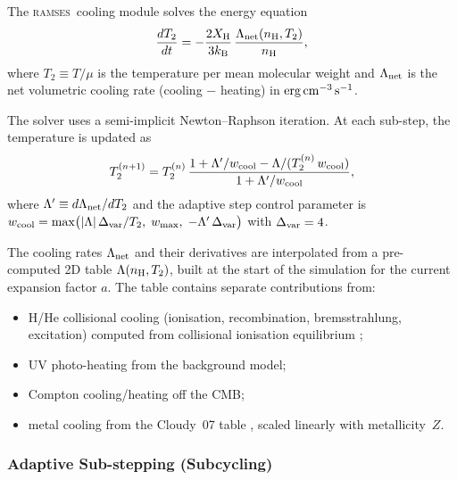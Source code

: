 \documentclass[fleqn,usenatbib]{mnras}
\newcommand{\ramses}{\textsc{ramses}}
\begin{document}
The \ramses\ cooling module solves the energy equation
\begin{equation}
  \frac{dT_2}{dt} = -\frac{2 X_{\rm H}}{3 k_{\rm B}}\,
  \frac{\Lambda_{\rm net}(n_{\rm H}, T_2)}{n_{\rm H}},
  \label{eq:cooling_ode}
\end{equation}
where $T_2 \equiv T/\mu$ is the temperature per mean molecular weight
and $\Lambda_{\rm net}$ is the net volumetric cooling rate
(cooling $-$ heating) in $\rm erg\,cm^{-3}\,s^{-1}$.

The solver uses a semi-implicit Newton--Raphson iteration.  At each
sub-step, the temperature is updated as
\begin{equation}
  T_2^{(n+1)} = T_2^{(n)}\,
  \frac{1 + \Lambda'/w_{\rm cool} - \Lambda/(T_2^{(n)}\,w_{\rm cool})}
       {1 + \Lambda'/w_{\rm cool}},
  \label{eq:NR_update}
\end{equation}
where $\Lambda' \equiv d\Lambda_{\rm net}/dT_2$ and the adaptive step
control parameter is
$w_{\rm cool} = \max\bigl(|\Lambda|\,\Delta_{\rm var}/T_2,\;
w_{\rm max},\;{-\Lambda'\,\Delta_{\rm var}}\bigr)$
with $\Delta_{\rm var} = 4$.

The cooling rates $\Lambda_{\rm net}$ and their derivatives are
interpolated from a pre-computed 2D table
$\Lambda(n_{\rm H}, T_2)$, built at the start of the simulation for the
current expansion factor $a$.  The table contains separate contributions
from:
\begin{itemize}
  \item H/He collisional cooling (ionisation, recombination,
    bremsstrahlung, excitation) computed from collisional ionisation
    equilibrium \citep[CIE;][]{Sutherland1993};
  \item UV photo-heating from the \citet{Courty2004} background model;
  \item Compton cooling/heating off the CMB;
  \item metal cooling from the Cloudy~07 table
    \citep{Ploeckinger2015}, scaled linearly with metallicity~$Z$.
\end{itemize}

\subsubsection{Adaptive Sub-stepping (Subcycling)}
\label{sec:subcycling}
\end{document}
